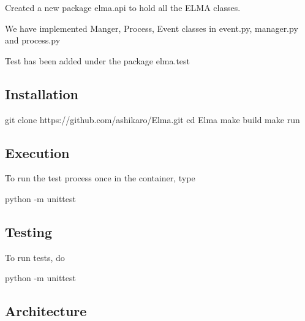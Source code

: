 \begin{DoxyEnumerate}
\item Created a new package elma.\+api to hold all the E\+L\+MA classes.
\end{DoxyEnumerate}
\begin{DoxyEnumerate}
\item We have implemented Manger, Process, Event classes in event.\+py, manager.\+py and process.\+py
\end{DoxyEnumerate}
\begin{DoxyEnumerate}
\item Test has been added under the package elma.\+test
\end{DoxyEnumerate}

\subsection*{Installation }

\begin{DoxyVerb}git clone https://github.com/ashikaro/Elma.git
cd Elma
make build
make run
\end{DoxyVerb}


\subsection*{Execution }

To run the test process once in the container, type \begin{DoxyVerb}python -m unittest
\end{DoxyVerb}


\subsection*{Testing }

To run tests, do 
\begin{DoxyCode}
python -m unittest
\end{DoxyCode}


\subsection*{Architecture }

